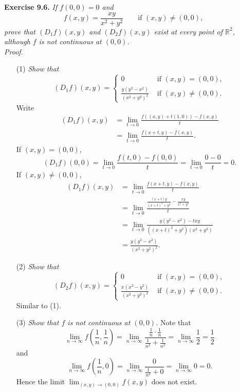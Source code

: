 \documentclass{article}
\begin{document}



\textbf{Exercise 9.6.}
\emph{If $f(0,0) = 0$ and
\[
  f(x,y) = \frac{xy}{x^2+y^2}
  \qquad \text{if }
  (x,y) \neq (0,0),
\]
prove that
$(D_1 f)(x,y)$ and $(D_2 f)(x,y)$ exist at every point of $\mathbb{R}^2$,
although $f$ is not continuous at $(0,0)$.} \\

\emph{Proof.}
\begin{enumerate}
\item[(1)]
  \emph{Show that}
  \begin{equation*}
  (D_1 f)(x,y) =
    \begin{cases}
      0                              & \text{ if $(x,y)=(0,0)$}, \\
      \frac{y(y^2-x^2)}{(x^2+y^2)^2} & \text{ if $(x,y)\neq(0,0)$}.
    \end{cases}
  \end{equation*}
  Write
  \begin{align*}
    (D_1 f)(x,y)
    &= \lim_{t \to 0} \frac{f((x,y) + t(1,0)) - f(x,y)}{t} \\
    &= \lim_{t \to 0} \frac{f(x+t,y) - f(x,y)}{t}.
  \end{align*}
  If $(x,y) = (0,0)$,
  \[
    (D_1 f)(0,0)
    = \lim_{t \to 0} \frac{f(t,0) - f(0,0)}{t}
    = \lim_{t \to 0} \frac{0 - 0}{t}
    = 0.
  \]
  If $(x,y) \neq (0,0)$,
  \begin{align*}
    (D_1 f)(x,y)
    &= \lim_{t \to 0} \frac{f(x+t,y) - f(x,y)}{t} \\
    &= \lim_{t \to 0} \frac{\frac{(x+t)y}{(x+t)^2+y^2} - \frac{xy}{x^2+y^2}}{t} \\
    &= \lim_{t \to 0} \frac{y(y^2-x^2)-txy}{((x+t)^2+y^2)(x^2+y^2)} \\
    &= \frac{y(y^2-x^2)}{(x^2+y^2)^2}.
  \end{align*}

\item[(2)]
  \emph{Show that}
  \begin{equation*}
  (D_2 f)(x,y) =
    \begin{cases}
      0                              & \text{ if $(x,y)=(0,0)$}, \\
      \frac{x(x^2-y^2)}{(x^2+y^2)^2} & \text{ if $(x,y)\neq(0,0)$}.
    \end{cases}
  \end{equation*}
  Similar to (1).

\item[(3)]
  \emph{Show that $f$ is not continuous at $(0,0)$.}
  Note that
  \[
    \lim_{n \to \infty} f\left(\frac{1}{n},\frac{1}{n}\right)
    = \lim_{n \to \infty} \frac{\frac{1}{n} \cdot \frac{1}{n}}{\frac{1}{n^2}+\frac{1}{n^2}}
    = \lim_{n \to \infty} \frac{1}{2}
    = \frac{1}{2}
  \]
  and
  \[
    \lim_{n \to \infty} f\left(\frac{1}{n},0\right)
    = \lim_{n \to \infty} \frac{0}{\frac{1}{n^2} + 0}
    = \lim_{n \to \infty} 0
    = 0.
  \]
  Hence the limit $\lim_{(x,y) \to (0,0)} f(x,y)$ does not exist.
\end{enumerate}
\end{document}
